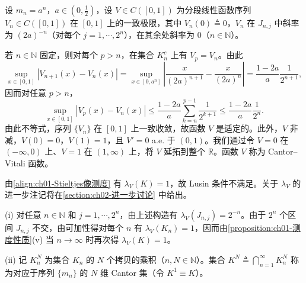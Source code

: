 \documentclass[../../main.tex]{subfiles}%
\begin{document}
设 $m_n=a^n$，$a\in(0,\frac{1}{2})$，设 $V\in C([0,1])$ 为分段线性函数序列 $V_n\in C([0,1])$ 在 $[0,1]$ 上的一致极限，其中 $V_n(0)\triangleq 0$，$V_n$ 在 $J_{n,j}$ 中斜率为 $(2a)^{-n}$（对每个 $j=1,\cdots ,2^n$），在其余处斜率为 $0$（$n\in\mathbb{N}$）。

若 $n\in\mathbb{N}$ 固定，则对每个 $p>n$，在集合 $K_n^c$ 上有 $V_p=V_n$。由此
\[
\sup_{x\in[0,1]}|V_{n+1}(x)-V_n(x)|
=\sup_{x\in[0,a^n]}\left|\frac{x}{(2a)^{n+1}}-\frac{x}{(2a)^n}\right|
=\frac{1-2a}{a}\frac{1}{2^{n+1}},
\]
因而对任意 $p>n$，
\[
\sup_{x\in[0,1]}|V_p(x)-V_n(x)|\leqslant\frac{1-2a}{a}\sum_{k=n}^{p-1}\frac{1}{2^{k+1}}
\leqslant\frac{1-2a}{a}\frac{1}{2^n}.
\]
由此不等式，序列 $\{V_n\}$ 在 $[0,1]$ 上一致收敛，故函数 $V$ 是适定的。此外，$V$ 非减，$V(0)=0$，$V(1)=1$，且 $V'=0$ a.e. 于 $(0,1)$。我们通过令 $V=0$ 在 $(-\infty,0)$ 上、$V=1$ 在 $(1,\infty)$ 上，将 $V$ 延拓到整个 $\mathbb{R}$。函数 $V$ 称为 Cantor--Vitali 函数。

由\eqref{align:ch01-Stieltjes像测度} 有 $\lambda_V(K)=1$，故 Lusin 条件不满足。关于 $\lambda_V$ 的进一步注记将在\cref{section:ch02-进一步讨论} 中给出。

\begin{remark}\label{remark:ch01-Cantor-Vitali}
(i) 对任意 $n\in\mathbb{N}$ 和 $j=1,\cdots ,2^n$，由上述构造有 $\lambda_V(J_{n,j})=2^{-n}$。由于 $2^n$ 个区间 $J_{n,j}$ 不交，由可加性得对每个 $n$ 有 $\lambda_V(K_n)=1$，因而由\cref{proposition:ch01-测度性质}(v) 当 $n\to\infty$ 时再次得 $\lambda_V(K)=1$。

(ii) 记 $K_n^N$ 为集合 $K_n$ 的 $N$ 个拷贝的乘积（$n,N\in\mathbb{N}$）。集合 $K^N\triangleq \bigcap_{n=1}^\infty K_n^N$ 称为对应于序列 $\{m_n\}$ 的 $N$ 维 Cantor 集（令 $K^1\equiv K$）。
\end{remark}
\end{document}
